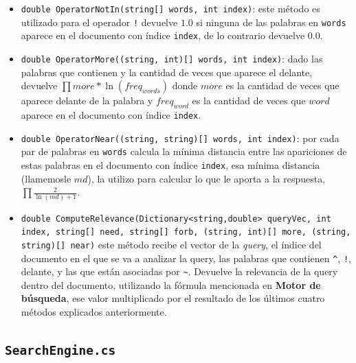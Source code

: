 \documentclass[a4paper, 12pt]{report}
\begin{document}
\begin{itemize}
	\item {\tt double OperatorNotIn(string[] words, int index)}: este m\'etodo es utilizado para el operador {\tt !} devuelve $1.0$ si ninguna de las palabras en {\tt words}
	      aparece en el documento con \'indice {\tt index}, de lo contrario devuelve $0.0$.
	\item {\tt double OperatorMore((string, int)[] words, int index)}: dado las palabras que contienen {\tt *} y la cantidad de veces que aparece el {\tt *} delante, devuelve $\prod more * \ln(freq_{words})$ donde $more$ es la cantidad de veces que {\tt *} aparece delante de la palabra y $freq_{word}$ es la cantidad de veces que $word$ aparece en el documento con \'indice {\tt index}.
	\item {\tt double OperatorNear((string, string)[] words, int index)}: por cada par de palabras en {\tt words} calcula la m\'inima distancia entre las apariciones de estas palabras en el documento con \'indice {\tt index}, esa m\'inima distancia (llamemosle $md$), la utilizo para calcular lo que le aporta a la respuesta, $\prod \frac{2}{\ln(md) + 1}$.
	\item {\tt double ComputeRelevance(Dictionary<string,double> queryVec, int index, string[] need, string[] forb, (string, int)[] more, (string, string)[] near)} este m\'etodo recibe el vector de la {\it query}, el \'indice del documento en el que se va a analizar la query, las palabras que contienen {\tt \^{}}, {\tt !}, {\tt *} delante, y las que est\'an asociadas por {\tt \~{}}. Devuelve la relevancia de la query dentro del documento, utilizando la f\'ormula mencionada en {\bf Motor de b\'usqueda}, ese valor multiplicado por el resultado de los \'ultimos cuatro m\'etodos explicados anteriormente.
\end{itemize}

\subsection*{\tt SearchEngine.cs}
\end{document}
